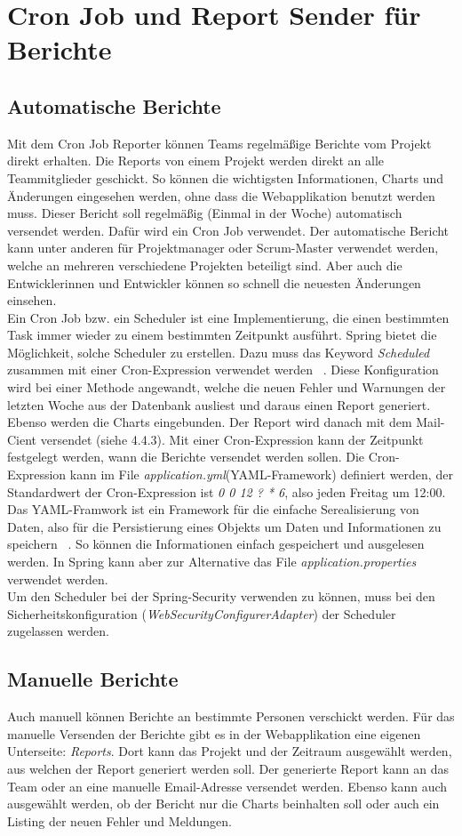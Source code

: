 \section{Cron Job und Report Sender für Berichte}
\subsection{Automatische Berichte} 
Mit dem Cron Job Reporter können Teams regelmäßige Berichte vom Projekt direkt erhalten. Die Reports von einem Projekt werden direkt an alle Teammitglieder geschickt. So können die wichtigsten Informationen, Charts und Änderungen eingesehen werden, ohne dass die Webapplikation benutzt werden muss. Dieser Bericht soll regelmäßig (Einmal in der Woche) automatisch versendet werden. Dafür wird ein Cron Job verwendet. Der automatische Bericht kann unter anderen für Projektmanager oder Scrum-Master verwendet werden, welche an mehreren verschiedene Projekten beteiligt sind. Aber auch die Entwicklerinnen und Entwickler können so schnell die neuesten Änderungen einsehen. \\ Ein Cron Job bzw. ein Scheduler ist eine Implementierung, die einen bestimmten Task immer wieder zu einem bestimmten Zeitpunkt ausführt. Spring bietet die Möglichkeit, solche Scheduler zu erstellen. Dazu muss das Keyword \textit{Scheduled} zusammen mit einer Cron-Expression verwendet werden ~\parencite{cintirScheduler}. Diese Konfiguration wird bei einer Methode angewandt, welche die neuen Fehler und Warnungen der letzten Woche aus der Datenbank ausliest und daraus einen Report generiert. Ebenso werden die Charts eingebunden. Der Report wird danach mit dem Mail-Cient versendet (siehe 4.4.3). Mit einer Cron-Expression kann der Zeitpunkt festgelegt werden, wann die Berichte versendet werden sollen. Die Cron-Expression kann im File \textit{application.yml}(YAML-Framework) definiert werden, der Standardwert der Cron-Expression ist \textit{0 0 12 ? * 6}, also jeden Freitag um 12:00. Das YAML-Framwork ist ein Framework für die einfache Serealisierung von Daten, also für die Persistierung eines Objekts um Daten und Informationen zu speichern ~\parencite{eriksson2011comparison}. So können die Informationen einfach gespeichert und ausgelesen werden. In Spring kann aber zur Alternative das File \textit{application.properties} verwendet werden. \\ Um den Scheduler bei der Spring-Security verwenden zu können, muss bei den Sicherheitskonfiguration (\textit{WebSecurityConfigurerAdapter}) der Scheduler zugelassen werden. 
\subsection{Manuelle Berichte}
Auch manuell können Berichte an bestimmte Personen verschickt werden. Für das manuelle Versenden der Berichte gibt es in der Webapplikation eine eigenen Unterseite: \textit{Reports}. Dort kann das Projekt und der Zeitraum ausgewählt werden, aus welchen der Report generiert werden soll. Der generierte Report kann an das Team oder an eine manuelle Email-Adresse versendet werden. Ebenso kann auch ausgewählt werden, ob der Bericht nur die Charts beinhalten soll oder auch ein Listing der neuen Fehler und Meldungen.
